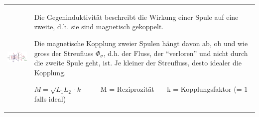 \begin{tabular}{ll}
\parbox{4.5cm}{
\includegraphics[width=4cm]{./bilder/gegeninduktivitaet.png}
}
& \parbox{14.5cm}{Die Gegeninduktivität beschreibt die Wirkung einer Spule auf
eine zweite, d.h. sie sind magnetisch gekoppelt.

Die magnetische Kopplung zweier Spulen hängt davon ab, ob und wie
gross der
Streufluss $\Phi_{\sigma}$, d.h. der Fluss, der ``verloren'' und nicht durch
die zweite Spule geht, ist. Je kleiner der Streufluss, desto idealer die
Kopplung.

$M=\sqrt{L_1L_2}\cdot k$ \ \ \ \ \ M = Reziprozität \ \ \ k = Kopplungsfaktor (= 1 falls ideal)}
\end{tabular}

